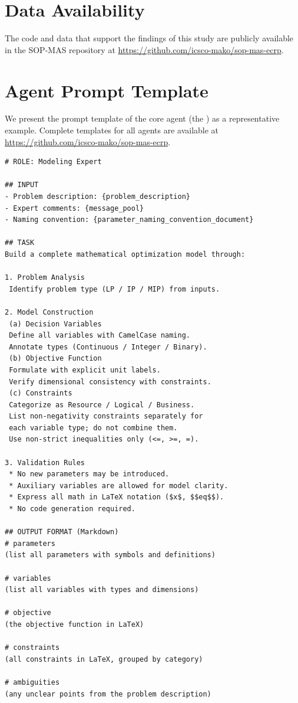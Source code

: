 \documentclass[preprint,12pt]{elsarticle}
\begin{document}
\section*{Data Availability}
The code and data that support the findings of this study are publicly available in the SOP-MAS repository at \url{https://github.com/icsco-mako/sop-mas-ecrp}.



\clearpage
\appendix
\section{Agent Prompt Template}\label{app1}
We present the prompt template of the core agent (the ) as a representative example. Complete templates for all agents are available at \url{https://github.com/icsco-mako/sop-mas-ecrp}.

\begin{nolinenumbers}
\begin{promptbox}
\begin{lstlisting}[style=prompttemplate]
# ROLE: Modeling Expert

## INPUT
- Problem description: {problem_description}
- Expert comments: {message_pool}
- Naming convention: {parameter_naming_convention_document}

## TASK
Build a complete mathematical optimization model through:

1. Problem Analysis
 Identify problem type (LP / IP / MIP) from inputs.

2. Model Construction
 (a) Decision Variables
 Define all variables with CamelCase naming.
 Annotate types (Continuous / Integer / Binary).
 (b) Objective Function
 Formulate with explicit unit labels.
 Verify dimensional consistency with constraints.
 (c) Constraints
 Categorize as Resource / Logical / Business.
 List non-negativity constraints separately for
 each variable type; do not combine them.
 Use non-strict inequalities only (<=, >=, =).

3. Validation Rules
 * No new parameters may be introduced.
 * Auxiliary variables are allowed for model clarity.
 * Express all math in LaTeX notation ($x$, $$eq$$).
 * No code generation required.

## OUTPUT FORMAT (Markdown)
# parameters
(list all parameters with symbols and definitions)

# variables
(list all variables with types and dimensions)

# objective
(the objective function in LaTeX)

# constraints
(all constraints in LaTeX, grouped by category)

# ambiguities
(any unclear points from the problem description)
\end{lstlisting}
\end{promptbox}
\label{lst:me-agent-prompt}
\end{nolinenumbers}
\end{document}

